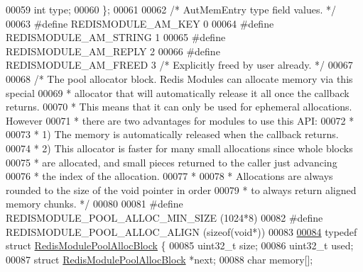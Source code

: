 \begin{DoxyCode}
00059     \textcolor{keywordtype}{int} type;
00060 \};
00061 
00062 \textcolor{comment}{/* AutMemEntry type field values. */}
00063 \textcolor{preprocessor}{#}\textcolor{preprocessor}{define} \textcolor{preprocessor}{REDISMODULE\_AM\_KEY} 0
00064 \textcolor{preprocessor}{#}\textcolor{preprocessor}{define} \textcolor{preprocessor}{REDISMODULE\_AM\_STRING} 1
00065 \textcolor{preprocessor}{#}\textcolor{preprocessor}{define} \textcolor{preprocessor}{REDISMODULE\_AM\_REPLY} 2
00066 \textcolor{preprocessor}{#}\textcolor{preprocessor}{define} \textcolor{preprocessor}{REDISMODULE\_AM\_FREED} 3 \textcolor{comment}{/* Explicitly freed by user already. */}
00067 
00068 \textcolor{comment}{/* The pool allocator block. Redis Modules can allocate memory via this special}
00069 \textcolor{comment}{ * allocator that will automatically release it all once the callback returns.}
00070 \textcolor{comment}{ * This means that it can only be used for ephemeral allocations. However}
00071 \textcolor{comment}{ * there are two advantages for modules to use this API:}
00072 \textcolor{comment}{ *}
00073 \textcolor{comment}{ * 1) The memory is automatically released when the callback returns.}
00074 \textcolor{comment}{ * 2) This allocator is faster for many small allocations since whole blocks}
00075 \textcolor{comment}{ *    are allocated, and small pieces returned to the caller just advancing}
00076 \textcolor{comment}{ *    the index of the allocation.}
00077 \textcolor{comment}{ *}
00078 \textcolor{comment}{ * Allocations are always rounded to the size of the void pointer in order}
00079 \textcolor{comment}{ * to always return aligned memory chunks. */}
00080 
00081 \textcolor{preprocessor}{#}\textcolor{preprocessor}{define} \textcolor{preprocessor}{REDISMODULE\_POOL\_ALLOC\_MIN\_SIZE} \textcolor{preprocessor}{(}1024\textcolor{preprocessor}{*}8\textcolor{preprocessor}{)}
00082 \textcolor{preprocessor}{#}\textcolor{preprocessor}{define} \textcolor{preprocessor}{REDISMODULE\_POOL\_ALLOC\_ALIGN} \textcolor{preprocessor}{(}\textcolor{keyword}{sizeof}\textcolor{preprocessor}{(}\textcolor{keywordtype}{void}\textcolor{preprocessor}{*}\textcolor{preprocessor}{)}\textcolor{preprocessor}{)}
00083 
\hyperlink{structRedisModulePoolAllocBlock}{00084} \textcolor{keyword}{typedef} \textcolor{keyword}{struct} \hyperlink{structRedisModulePoolAllocBlock}{RedisModulePoolAllocBlock} \{
00085     uint32\_t size;
00086     uint32\_t used;
00087     \textcolor{keyword}{struct} \hyperlink{structRedisModulePoolAllocBlock}{RedisModulePoolAllocBlock} *next;
00088     \textcolor{keywordtype}{char} memory[];

\end{DoxyCode}
